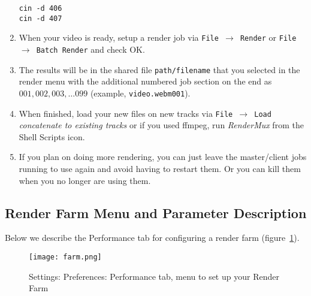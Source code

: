 \begin{enumerate}
\begin{lstlisting}[style=sh]
cin -d 406
cin -d 407
\end{lstlisting}
\item When your video is ready, setup a render job via \texttt{File
    $\rightarrow$ Render} or \texttt{File $\rightarrow$ Batch Render}
  and check OK.
\item The results will be in the shared file \texttt{path/filename}
  that you selected in the render menu with the additional numbered
  job section on the end as $001, 002, 003, \dots 099$ (example,
  \texttt{video.webm001}).
\item When finished, load your new files on new tracks via
  \texttt{File $\rightarrow$ Load} \textit{concatenate to existing
    tracks} or if you used ffmpeg, run \textit{RenderMux} from the Shell
  Scripts icon.
\item If you plan on doing more rendering, you can just leave the
  master/client jobs running to use again and avoid having to restart
  them.  Or you can kill them when you no longer are using them.
\end{enumerate}

\subsection{Render Farm Menu and Parameter Description}%
\label{sub:render_farm_parameter_description}

Below we describe the Performance tab for configuring a render farm
(figure~\ref{fig:farm}).

\begin{figure}[htpb] \centering
  \texttt{[image: farm.png]}
  \caption{Settings: Preferences: Performance tab, menu
    to set up your Render Farm}
  \label{fig:farm}
\end{figure}

